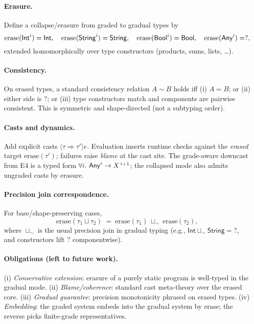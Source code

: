 \paragraph{Erasure.}
Define a collapse/erasure from graded to gradual types by
\[
\mathrm{erase}(\mathsf{Int}^{i})=\mathsf{Int},\quad
\mathrm{erase}(\mathsf{String}^{i})=\mathsf{String},\quad
\mathrm{erase}(\mathsf{Bool}^{i})=\mathsf{Bool},\quad
\mathrm{erase}(\mathsf{Any}^{i})=?,
\]
extended homomorphically over type constructors (products, sums, lists, \dots).

\paragraph{Consistency.}
On erased types, a standard consistency relation \(A \mathrel{\sim} B\) holds iff
(i) \(A=B\); or (ii) either side is \(?\); or (iii) type constructors match and components are pairwise consistent.
This is symmetric and shape-directed (not a subtyping order).

\paragraph{Casts and dynamics.}
Add explicit casts \(\langle \tau \Rightarrow \tau'\rangle e\).
Evaluation inserts runtime checks against the \emph{erased} target \(\mathrm{erase}(\tau')\);
failures raise \emph{blame} at the cast site.
The grade-aware downcast from \textsc{E4} is a typed form
\(\forall i.\ \mathsf{Any}^{i} \to X^{\,i+1}\);
the collapsed mode also admits ungraded casts by erasure.

\paragraph{Precision join correspondence.}
For base/shape-preserving cases,
\[
\mathrm{erase}(\tau_1 \sqcup \tau_2)
\;=\;
\mathrm{erase}(\tau_1)\ \sqcup_{\!\sim}\ \mathrm{erase}(\tau_2),
\]
where \(\sqcup_{\!\sim}\) is the usual precision join in gradual typing (e.g., \(\mathsf{Int}\sqcup_{\!\sim}\mathsf{String}=?\), and constructors lift \(?\) componentwise).

\paragraph{Obligations (left to future work).}
(i) \emph{Conservative extension}: erasure of a purely static program is well-typed in the gradual mode. 
(ii) \emph{Blame/coherence}: standard cast meta-theory over the erased core. 
(iii) \emph{Gradual guarantee}: precision monotonicity phrased on erased types. 
(iv) \emph{Embedding}: the graded system embeds into the gradual system by \(\mathrm{erase}\); the reverse picks finite-grade representatives.


